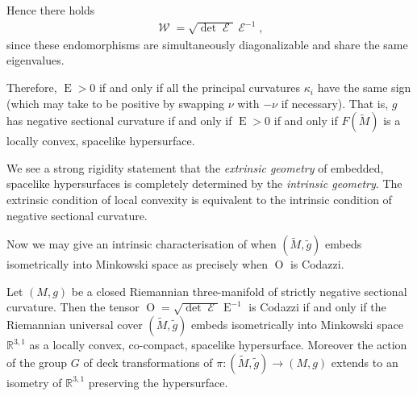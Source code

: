 \documentclass{cambridge7a}
\renewcommand{\~}{\tilde}
\renewcommand{\-}{\bar}
\newcommand{\R}{\mathbb{R}}
\newcommand{\8}{\infty}
\DeclareMathOperator{\Ein}{E}
\DeclareMathOperator{\opEin}{\mathcal{E}}
\DeclareMathOperator{\W}{\mathcal{W}}
\newcommand{\eq}[1]{\begin{equation}\begin{alignedat}{2} #1 \end{alignedat}\end{equation}}
\DeclareMathOperator{\Ob}{O}
\begin{document}
Hence there holds
\eq{\label{lem:ein_W}
\W = \sqrt{\det \opEin} \opEin^{-1},
}
since these endomorphisms are simultaneously diagonalizable and share the same eigenvalues.

Therefore, \(\Ein > 0\) if and only if all the principal curvatures \(\kappa_i\) have the same sign (which may take to be positive by swapping \(\nu\) with \(-\nu\) if necessary). That is, \(g\) has negative sectional curvature if and only if \(\Ein > 0\) if and only if \(F(\tilde{M})\) is a locally convex, spacelike hypersurface.

\begin{rem}
We see a strong rigidity statement that the \emph{extrinsic geometry} of embedded, spacelike hypersurfaces is completely determined by the \emph{intrinsic geometry}. The extrinsic condition of local convexity is equivalent to the intrinsic condition of negative sectional curvature.
\end{rem}

Now we may give an intrinsic characterisation of when \((\tilde{M}, \tilde{g})\) embeds isometrically into Minkowski space as precisely when \(\Ob\) is Codazzi.

\begin{thm}
\label{thm:intg_embed}

Let \((M, g)\) be a closed Riemannian three-manifold of strictly negative sectional curvature. Then the tensor \(\Ob = \sqrt{\det \opEin} \Ein^{-1}\) is Codazzi if and only if the Riemannian universal cover \((\tilde{M}, \tilde{g})\) embeds isometrically into Minkowski space \(\R^{3,1}\) as a locally convex, co-compact, spacelike hypersurface. Moreover the action of the group \(G\) of deck transformations of \(\pi : (\tilde{M}, \tilde{g}) \to (M, g)\) extends to an isometry of \(\R^{3,1}\) preserving the hypersurface.
\end{thm}
\end{document}
